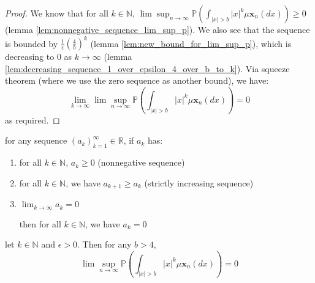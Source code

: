 \begin{proof}
    We know that for all $k \in \mathbb{N}$, $\lim\sup_{n\to\infty}\mathbb{P}(\int_{|x| > b}|x|^{k}\mu \mathbf{x}_{n}(dx)) \geq 0$ (lemma \ref{lem:nonnegative_sequence_lim_sup_p}). We also see that the sequence is bounded by $\frac{1}{\epsilon} (\frac{4}{b})^{k}$ (lemma \ref{lem:new_bound_for_lim_sup_p}), which is decreasing to $0$ as $k\to\infty$ (lemma \ref{lem:decreasing_sequence_1_over_epsilon_4_over_b_to_k}). Via squeeze theorem (where we use the zero sequence as another bound), we have:
    $$
    \lim_{k\to\infty} \lim\sup_{n\to\infty}\mathbb{P}(\int_{|x| > b}|x|^{k}\mu \mathbf{x}_{n}(dx)) = 0
    $$ 
    as required.
\end{proof}

\begin{lemma}
    \label{lem:all_terms_zero_conditions}
    \notready
    for any sequence $(a_{k})_{k=1}^{\infty} \in \mathbb{R}$, if $a_{k}$ has:
    \begin{enumerate}
        \item for all $k \in \mathbb{N}$,  $a_{k} \geq 0$ (nonnegative sequence)
        \item for all $k \in \mathbb{N}$, we have  $a_{k+1} \geq a_{k}$ (strictly increasing sequence)
        \item $\lim_{k\to\infty} a_{k} = 0$

        then for all $k \in \mathbb{N}$, we have $a_{k} = 0$
    \end{enumerate}
\end{lemma}

\begin{lemma}
    \label{lem:convergence_to_zero_of_lim_sup_p}
    \notready
    let $k \in \mathbb{N}$ and  $\epsilon > 0$. Then for any  $b > 4$,
    $$
    \lim \sup_{n\to\infty}\mathbb{P}(\int_{|x| > b}|x|^{k} \mu\mathbf{x}_{n}(dx)) = 0
    $$
\end{lemma}

